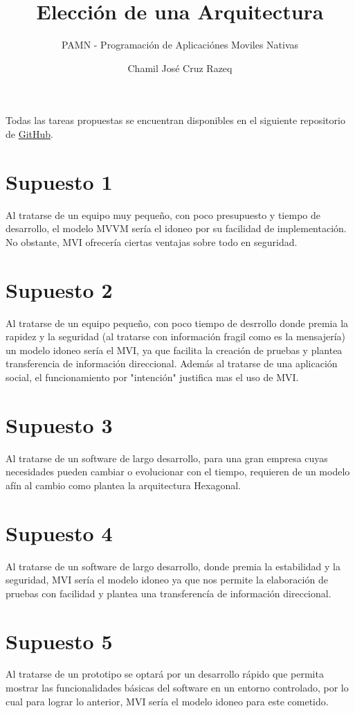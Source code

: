 \documentclass{scrartcl}
\title{Elección de una Arquitectura}
\subtitle{\large PAMN - Programación de Aplicaciónes Moviles Nativas}
\author{Chamil José Cruz Razeq}
\begin{document}
    \maketitle
    \thispagestyle{empty}
    \newpage

    Todas las tareas propuestas se encuentran disponibles en el siguiente
         repositorio de \href{https://github.com/chamilstudy/ulpgc_pamn_labs}{GitHub}.

    \section{Supuesto 1}
        Al tratarse de un equipo muy pequeño, con poco presupuesto y tiempo de desarrollo,
         el modelo MVVM sería el idoneo por su facilidad de implementación. No obstante, 
         MVI ofrecería ciertas ventajas sobre todo en seguridad.
    \section{Supuesto 2}
        Al tratarse de un equipo pequeño, con poco tiempo de desrrollo donde premia la
         rapidez y la seguridad (al tratarse con información fragil como es la mensajería)
         un modelo idoneo sería el MVI, ya que facilita la creación de pruebas y plantea
         transferencia de información direccional. Además al tratarse de una aplicación social,
         el funcionamiento por "intención" justifica mas el uso de MVI.
    \section{Supuesto 3}
        Al tratarse de un software de largo desarrollo, para una gran empresa cuyas
         necesidades pueden cambiar o evolucionar con el tiempo, requieren de un modelo
         afín al cambio como plantea la arquitectura Hexagonal.
    \section{Supuesto 4}
        Al tratarse de un software de largo desarrollo, donde premia la estabilidad
         y la seguridad, MVI sería el modelo idoneo ya que nos permite la elaboración
         de pruebas con facilidad y plantea una transferencía de información direccional.
    \section{Supuesto 5}
        Al tratarse de un prototipo se optará por un desarrollo rápido que permita
         mostrar las funcionalidades básicas del software en un entorno controlado,
         por lo cual para lograr lo anterior, MVI sería el modelo idoneo para este
         cometido.
        
\end{document}
